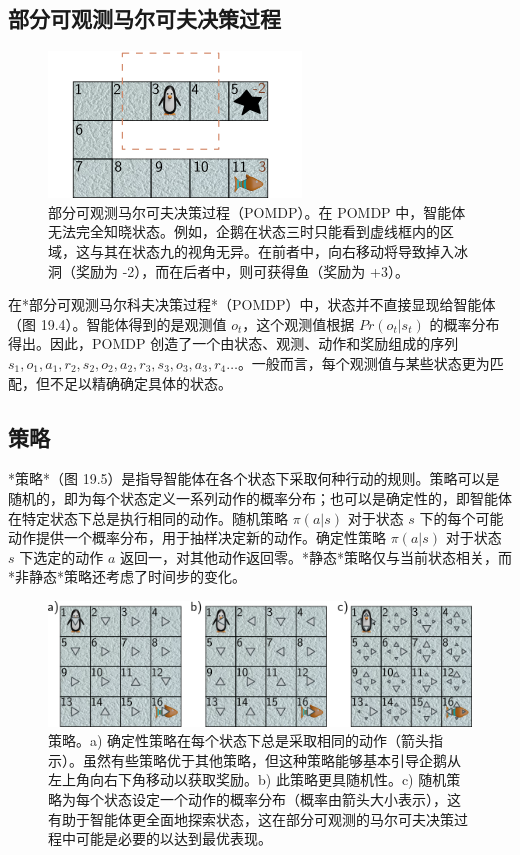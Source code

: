 \subsection{部分可观测马尔可夫决策过程}
\begin{figure}[ht!]
\centering
\includegraphics[width=0.7\linewidth]{png/chapter19/ReinforcePOMDP.png}
\caption{部分可观测马尔可夫决策过程（POMDP）。在 POMDP 中，智能体无法完全知晓状态。例如，企鹅在状态三时只能看到虚线框内的区域，这与其在状态九的视角无异。在前者中，向右移动将导致掉入冰洞（奖励为 -2），而在后者中，则可获得鱼（奖励为 +3）。}
\end{figure}
在*部分可观测马尔科夫决策过程*（POMDP）中，状态并不直接显现给智能体（图 19.4）。智能体得到的是观测值 \(o_t\)，这个观测值根据 \(Pr(o_t|s_t)\) 的概率分布得出。因此，POMDP 创造了一个由状态、观测、动作和奖励组成的序列 \(s_1, o_1, a_1, r_2, s_2, o_2, a_2, r_3, s_3, o_3, a_3, r_4 \ldots\)。一般而言，每个观测值与某些状态更为匹配，但不足以精确确定具体的状态。

\subsection{策略}
*策略*（图 19.5）是指导智能体在各个状态下采取何种行动的规则。策略可以是随机的，即为每个状态定义一系列动作的概率分布；也可以是确定性的，即智能体在特定状态下总是执行相同的动作。随机策略 \(\pi(a|s)\) 对于状态 \(s\) 下的每个可能动作提供一个概率分布，用于抽样决定新的动作。确定性策略 \(\pi(a|s)\) 对于状态 \(s\) 下选定的动作 \(a\) 返回一，对其他动作返回零。*静态*策略仅与当前状态相关，而*非静态*策略还考虑了时间步的变化。
\begin{figure}[ht!]
\centering
\includegraphics[width=0.7\linewidth]{png/chapter19/ReinforcePolicy.png}
\caption{策略。a) 确定性策略在每个状态下总是采取相同的动作（箭头指示）。虽然有些策略优于其他策略，但这种策略能够基本引导企鹅从左上角向右下角移动以获取奖励。b) 此策略更具随机性。c) 随机策略为每个状态设定一个动作的概率分布（概率由箭头大小表示），这有助于智能体更全面地探索状态，这在部分可观测的马尔可夫决策过程中可能是必要的以达到最优表现。}
\end{figure}

